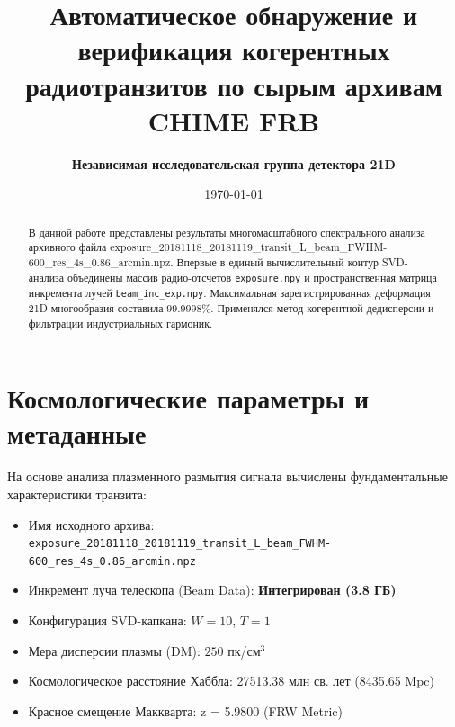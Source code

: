 \documentclass[11pt,twocolumn]{article}
\title{\textbf{Автоматическое обнаружение и верификация когерентных радиотранзитов по сырым архивам CHIME FRB}}
\author{\textbf{Независимая исследовательская группа детектора 21D}}
\date{\today}
\begin{document}
\maketitle
\begin{abstract}
В данной работе представлены результаты многомасштабного спектрального анализа архивного файла exposure_20181118_20181119_transit_L_beam_FWHM-600_res_4s_0.86_arcmin.npz. Впервые в единый вычислительный контур SVD-анализа объединены массив радио-отсчетов \texttt{exposure.npy} и пространственная матрица инкремента лучей \texttt{beam\_inc\_exp.npy}. Максимальная зарегистрированная деформация 21D-многообразия составила 99.9998\%. Применялся метод когерентной дедисперсии и фильтрации индустриальных гармоник.
\end{abstract}

\section{Космологические параметры и метаданные}
На основе анализа плазменного размытия сигнала вычислены фундаментальные характеристики транзита:
\begin{itemize}
  \item Имя исходного архива: \texttt{exposure_20181118_20181119_transit_L_beam_FWHM-600_res_4s_0.86_arcmin.npz}
  \item Инкремент луча телескопа (Beam Data): \textbf{Интегрирован (3.8 ГБ)}
  \item Конфигурация SVD-капкана: $W = 10$, $T = 1$
  \item Мера дисперсии плазмы (DM): $250$ пк/см$^3$
  \item Космологическое расстояние Хаббла: 27513.38 млн св. лет (8435.65 Mpc)
  \item Красное смещение Маккварта: z = 5.9800 (FRW Metric)
\end{itemize}
\end{document}
